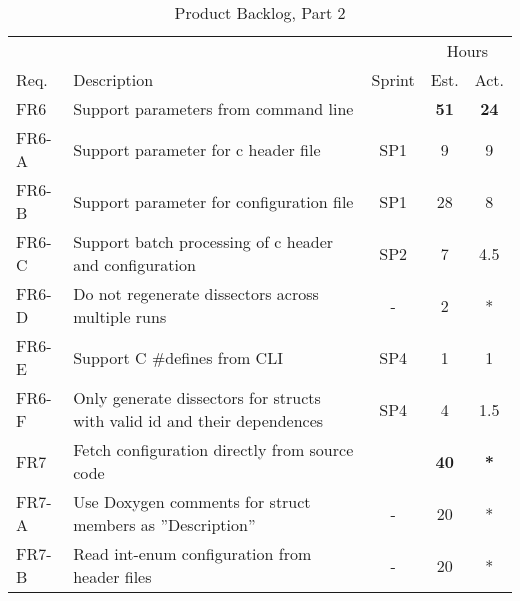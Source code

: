 \begin{table}[htbp] \small \center
\caption{Product Backlog, Part 2 \label{tab:prodbacklog2}}
\begin{tabularx}{\textwidth}{l X c c c}
	\toprule
	& & & \multicolumn{2}{c}{Hours} \\
	\cmidrule(r){4-5}
	Req. & Description & Sprint & Est. & Act. \\
	\midrule	
	FR6 & Support parameters from command line & & \textbf{51} & \textbf{24}\\
	FR6-A & Support parameter for \Gls{c} \gls{header} file & SP1 & 9 & 9 \\
	FR6-B & Support parameter for configuration file & SP1 & 28 & 8 \\
	FR6-C & Support batch processing of \Gls{c} \gls{header} and configuration & SP2 & 7 & 4.5 \\
	FR6-D & Do not regenerate dissectors across multiple runs & - & 2 & *\\
	FR6-E & Support C \#defines from CLI & SP4 & 1 & 1 \\
	FR6-F & Only generate dissectors for structs with valid id and their dependences & SP4 & 4 & 1.5\\
    \addlinespace
	FR7 & Fetch configuration directly from source code & & \textbf{40} &  \textbf{*} \\
	FR7-A & Use Doxygen comments for struct members as ''Description'' & - & 20 & *\\
	FR7-B & Read int-enum configuration from header files & - & 20 & * \\
	\bottomrule
\end{tabularx}
\end{table}

